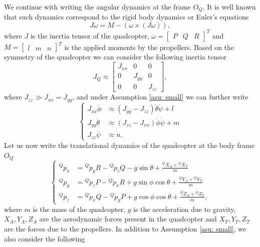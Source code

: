 \documentclass[a4paper, onecolumn]{ieeeconf}
\begin{document}
We continue with writing the angular dynamics at the frame $O_Q$. It is well known that such dynamics correspond to the rigid body dynamics or Euler's equations\begin{equation}
	J\dot\omega = M - \left(\omega\times (J\omega)\right),
\end{equation}
where $J$ is the inertia tensor of the quadcopter, $\omega = \begin{bmatrix}P&Q&R\end{bmatrix}^T$ and $M = \begin{bmatrix}l & m & n\end{bmatrix}^T$ is the applied moments by the propellers. Based on the symmetry of the quadcopter we can consider the following inertia tensor
\begin{equation}
J_Q \approx \begin{bmatrix}J_{xx} & 0 & 0 \\ 0 & J_{yy} & 0 \\ 0 & 0 & J_{zz} \end{bmatrix},
\end{equation}
where $J_{zz} \gg J_{xx} = J_{yy}$, and under Assumption \ref{asu: small} we can further write
\begin{equation}
	\begin{cases}
		J_{xx}\ddot \phi &\approx (J_{yy}-J_{zz})\dot\theta\dot\psi + l \\
		J_{yy}\ddot \theta &\approx (J_{zz}-J_{xx})\dot\phi\dot\psi + m \\
		J_{zz}\ddot \psi &\approx n.
\end{cases}
\label{eq: attdyn}
\end{equation}
Let us now write the translational dynamics of the quadcopter at the body frame $O_Q$
\begin{equation}
	\begin{cases}
		^Q\ddot p_x &= {^Q\dot p_y}R - {^Q\dot p_z}Q - g\sin{\theta} + \frac{^QX_A + {^QX_T}}{m} \\
		^Q\ddot p_y &=  {^Q\dot p_z}P -{^Q\dot p_x}R + g\sin{\phi}\cos{\theta} + \frac{^QY_A + {^QY_T}}{m} \\
		^Q\ddot p_z &= {^Q\dot p_x}Q - {^Q\dot p_y}P + g\cos{\phi}\cos{\theta} + \frac{^QZ_A + {^QZ_T}}{m},
	\end{cases}
	\label{eq: Qdyn}
\end{equation}
where $m$ is the mass of the quadcopter, $g$ is the acceleration due to gravity, $X_A, Y_A, Z_A$ are the aerodynamic forces present in the quadcopter and $X_T, Y_T, Z_T$ are the forces due to the propellers. In addition to Assumption \ref{asu: small}, we also consider the following
\end{document}

